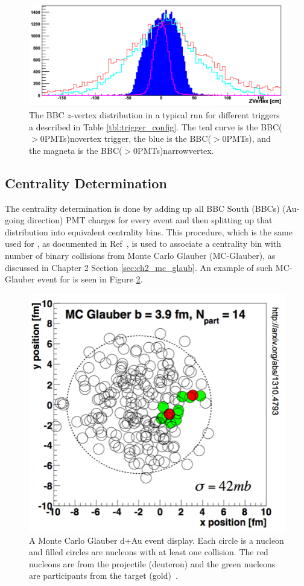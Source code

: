 \begin{figure}[h!]
\centering
\includegraphics[width=0.65\linewidth]{figs/bbc_z_vertex_dist.png}
\caption{The BBC $z$-vertex distribution in a typical \pau run for different triggers a described in Table \ref{tbl:trigger_config}.  The teal curve is the BBC($>$0\thinspace PMTs)\thinspace novertex trigger, the blue is the BBC($>$0\thinspace PMTs), and the magneta is the BBC($>$0\thinspace PMTs)\thinspace narrowvertex.}
\label{fig:bbc_z_vtx_dist}
\end{figure}

\subsection{Centrality Determination}
\label{sec:central_determin}
The centrality determination is done by adding up all BBC South (BBCs) (Au-going direction) PMT charges for every event and then splitting up that distribution into equivalent centrality bins. This procedure, which is the same used for \dau, as documented in Ref~\cite{PhysRevC.90.034902}, is used to associate a centrality bin with number of binary collisions from Monte Carlo Glauber (MC-Glauber), as discussed in Chapter 2 Section \ref{sec:ch2_mc_glaub}. An example of such MC-Glauber event for \dau is seen in Figure \ref{fig:glauber_event_display}.  
\label{centrality_determination}
\begin{figure}[!ht]
\centering
\includegraphics[width=0.5\linewidth]{figs/glauber_event_display.png}
\caption{A Monte Carlo Glauber d+Au event display. Each circle is a nucleon and filled circles are nucleons with at least one collision. The red nucleons are from the projectile (deuteron) and the green nucleons are participants from the target (gold)~\cite{PhysRevC.90.034902}.}
\label{fig:glauber_event_display}
\end{figure}

